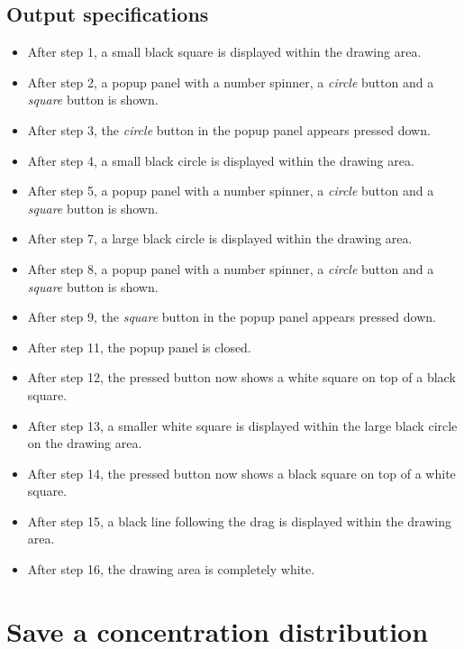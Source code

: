 \subsection*{Output specifications}
\begin{itemize}
\item After step 1, a small black square is displayed within the drawing area.
\item After step 2, a popup panel with a number spinner, a \emph{circle} button and a \emph{square} button is shown.
\item After step 3, the \emph{circle} button in the popup panel appears pressed down.
\item After step 4, a small black circle is displayed within the drawing area.
\item After step 5, a popup panel with a number spinner, a \emph{circle} button and a \emph{square} button is shown.
\item After step 7, a large black circle is displayed within the drawing area.
\item After step 8, a popup panel with a number spinner, a \emph{circle} button and a \emph{square} button is shown.
\item After step 9, the \emph{square} button in the popup panel appears pressed down.
\item After step 11, the popup panel is closed.
\item After step 12, the pressed button now shows a white square on top of a black square.
\item After step 13, a smaller white square is displayed within the large black circle on the drawing area.
\item After step 14, the pressed button now shows a black square on top of a white square.
\item After step 15, a black line following the drag is displayed within the drawing area.
\item After step 16, the drawing area is completely white.
\end{itemize}

\section{Save a concentration distribution}

